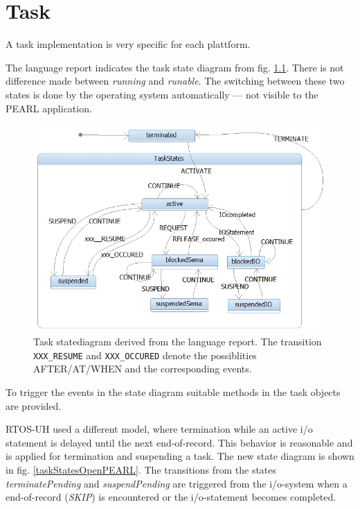 \chapter{Task}
\label{task}
A task implementation is very specific for each plattform.

The language report indicates the task state diagram from 
fig. \ref{taskStatesPEARL90}. There is not difference made between {\em running} and {\em runable}. The switching between these two states is done by the
operating system automatically --- not visible to the PEARL application.

\begin{figure}[bpht]
\includegraphics[width=14cm]{taskStatesPEARL90.jpg}
\caption{Task statediagram derived from the language report.
The transition \texttt{XXX\_RESUME} and \texttt{XXX\_OCCURED} denote 
the possiblities AFTER/AT/WHEN and the corresponding events.}
\label{taskStatesPEARL90}
\end{figure}

To trigger the events in the state diagram suitable methods in the task 
objects are provided. 

RTOS-UH used a different model, where termination while an active i/o statement
is delayed until the next end-of-record. 
This behavior is reasonable and is applied for termination and
suspending a task. The new state diagram is shown in 
fig. \ref{taskStatesOpenPEARL}.
The transitions from the  states {\em terminatePending} and 
{\em suspendPending}  are triggered from the i/o-system when a end-of-record
({\em SKIP}) is encountered or the i/o-statement becomes completed.

